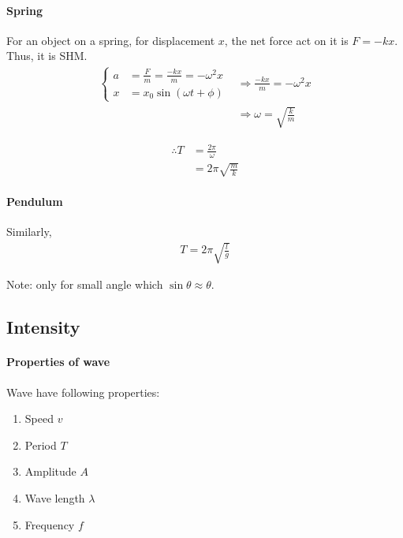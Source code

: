         \paragraph{Spring}
            For an object on a spring, for displacement $x$, the net force act on it is $F = -kx$. Thus, it is SHM.
            \begin{align}
                \left\{
                    \begin{aligned}
                        a &= \frac{F}{m} = \frac{-k x}{m} = - \omega^2 x \\
                        x &= x_0 \sin(\omega t + \phi)
                    \end{aligned}
                \right. & \Rightarrow 
                \frac{-k x}{m} = - \omega^2 x \\
                & \Rightarrow \omega = \sqrt{\frac{k}{m}}
            \end{align}

            \begin{align}
                \therefore T &= \frac{2 \pi}{\omega} \\
                             &= 2 \pi \sqrt{\frac{m}{k}}
            \end{align}

        \paragraph{Pendulum}
            Similarly,
            \begin{align}
                T = 2 \pi \sqrt{\frac{l}{g}}
            \end{align}
            
            Note: only for small angle which $\sin \theta \approx \theta$.

    \subsection{Intensity}
        \paragraph{Properties of wave}
            Wave have following properties:
            \begin{enumerate}
                \item Speed $v$
                \item Period $T$
                \item Amplitude $A$
                \item Wave length $\lambda$
                \item Frequency $f$
            \end{enumerate}

